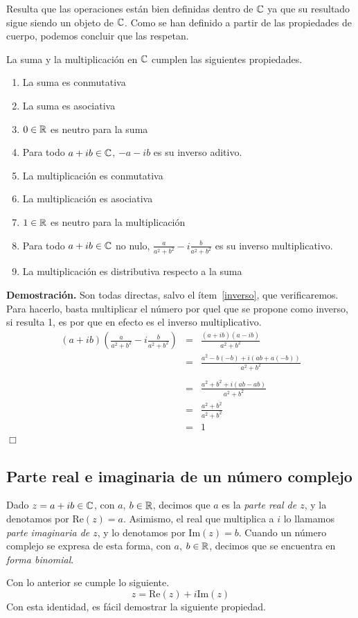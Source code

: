 Resulta que las operaciones están bien definidas dentro de $\mathbb{C}$  ya que su resultado sigue siendo un objeto de $\mathbb{C}$.
Como se han definido a partir de las propiedades de cuerpo, podemos concluir que las respetan.

\medskip

\begin{prop}
La suma y la multiplicación en $\mathbb{C}$ cumplen las siguientes propiedades.
\begin{enumerate}
\item La suma es conmutativa
\item La suma es asociativa
\item $0\in\mathbb{R}$ es neutro para la suma
\item Para todo $a+ib\in\mathbb{C}$, $-a-ib$ es su inverso aditivo.
\item La multiplicación es conmutativa
\item La multiplicación es asociativa
\item $1\in\mathbb{R}$ es neutro para la multiplicación
\item\label{inverso} Para todo $a+ib\in\mathbb{C}$ no nulo, $\frac{a}{a^2+b^2}-i\frac{b}{a^2+b^2}$ es su inverso multiplicativo.
\item La multiplicación es distributiva respecto a la suma
\end{enumerate}
\end{prop}	
{\bf Demostración.} Son todas directas, salvo el ítem~\ref{inverso}, que verificaremos. Para hacerlo, basta multiplicar el número por quel que se propone como inverso, si resulta 1, es por que en efecto es el inverso multiplicativo.
\begin{eqnarray*}
			(a+ib)\left(\frac{a}{a^2+b^2}-i\frac{b}{a^2+b^2}\right)&=&\frac{(a+ib)(a-ib)}{a^2+b^2}\\
			&=&\frac{a^2-b(-b)+i(ab+a(-b))}{a^2+b^2}\\\\
			&=&\frac{a^2+b^2+i(ab-ab)}{a^2+b^2}\\
			&=&\frac{a^2+b^2}{a^2+b^2}\\
			&=&1
		\end{eqnarray*}
\hfill $\Box$

\subsection{Parte real e imaginaria de un número complejo}

\begin{defn}
Dado $z=a+ib \in\mathbb{C}$, con $a$, $b\in\mathbb{R}$, decimos que $a$ es la \emph{parte real de $z$}, y la denotamos por $\mbox{Re}(z)=a$.
Asimismo, el real que multiplica a $i$ lo llamamos \emph{parte imaginaria de $z$}, y lo denotamos por $\mbox{Im}(z)=b$.
Cuando un número complejo se expresa de esta forma, con $a$, $b\in\mathbb{R}$, decimos que se encuentra en \emph{forma binomial}.
\end{defn}
Con lo anterior se cumple lo siguiente.
$$z=\mbox{Re}(z)+i\mbox{Im}(z)$$
Con esta identidad, es fácil demostrar la siguiente propiedad.

